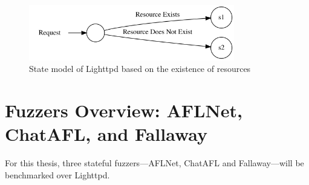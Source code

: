 \begin{figure}[H]
    \centering
    \includegraphics[width=0.8\textwidth]{Images/existent_nonexistent_resource.png}
    \caption{State model of Lighttpd based on the existence of resources}
    \label{fig:existent_nonexistent_resource_statemodel}
\end{figure}

\section{Fuzzers Overview: AFLNet, ChatAFL, and Fallaway}

For this thesis, three stateful fuzzers—AFLNet, ChatAFL and Fallaway—will be benchmarked over Lighttpd.
 
